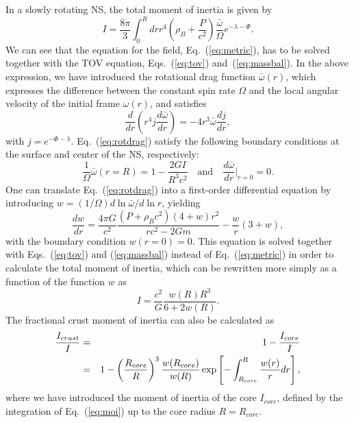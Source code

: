 In a slowly rotating NS, the total moment of inertia is given
by~\cite{Hartle1967}
%
\begin{equation}
  I = \frac{8\pi}{3}\int_0^R dr r^4\left(\rho_B +
  \frac{P}{c^2}\right)
  \frac{\bar{\omega}}{\Omega}e^{-\lambda-\Phi}\label{eq:moi}.
\end{equation}
%
We can see that the equation for the field, Eq.~(\ref{eq:metric}), has to be
solved together with the TOV equation, Eqs.~(\ref{eq:tov}) 
and~(\ref{eq:massbal}). In the above expression, we have introduced the 
rotational drag function $\bar{\omega}(r)$, which expresses the difference
between the constant spin rate $\Omega$ and the local angular velocity of the
initial frame $\omega(r)$, and satisfies
%
\begin{equation}
  \frac{d}{dr}\left(r^4j\frac{d\bar{\omega}}{dr}\right) =
  -4r^3\bar{\omega}\frac{dj}{dr},\label{eq:rotdrag}
\end{equation}
%
with $j=e^{-\Phi-\lambda}$. Eq.~(\ref{eq:rotdrag}) satisfy the following
boundary conditions at the surface and center of the NS, respectively:
%
\begin{equation}
  \frac{1}{\Omega}\bar{\omega}(r=R) = 1 - \frac{2GI}{R^3c^2} \quad \text{and} 
  \quad \frac{d\bar{\omega}}{dr}\bigg|_{r=0} = 0.
\end{equation}
%
One can translate Eq.~(\ref{eq:rotdrag}) into a first-order differential
equation by introducing $w = (1/\Omega)d\ln\bar{\omega}/d\ln r$, yielding
%
\begin{equation}
  \frac{dw}{dr} = \frac{4\pi G}{c^2}\frac{(P+\rho_Bc^2)(4+w)r^2}{rc^2-2Gm} -
  \frac{w}{r}(3+w)\label{eq:rotdrag2},
\end{equation}
%
with the boundary condition $w(r=0) = 0$. This equation is solved together with 
Eqs.~(\ref{eq:tov}) and (\ref{eq:massbal}) instead of Eq.~(\ref{eq:metric}) in 
order to calculate the total moment of inertia, which can be rewritten more
simply as a function of the function $w$ as
%
\begin{equation}
  I = \frac{c^2}{G}\frac{w(R)R^3}{6 + 2w(R)}.
\end{equation}
%
The fractional crust moment of inertia can also be calculated 
as~\cite{Lim2019}
%
\begin{eqnarray}
  \frac{I_{crust}}{I} &=& 1 - \frac{I_{core}}{I}\notag\\
                      &=& 1 - \left(\frac{R_{core}}{R}\right)^3
                      \frac{w(R_{core})}{w(R)}
                      \exp\left[-\int_{R_{core}}^{R}\frac{w(r)}{r}dr\right],
                      \label{eq:crustmoi}
\end{eqnarray}
%
where we have introduced the moment of inertia of the core $I_{core}$, defined
by the integration of Eq.~(\ref{eq:moi}) up to the core radius $R=R_{core}$.


